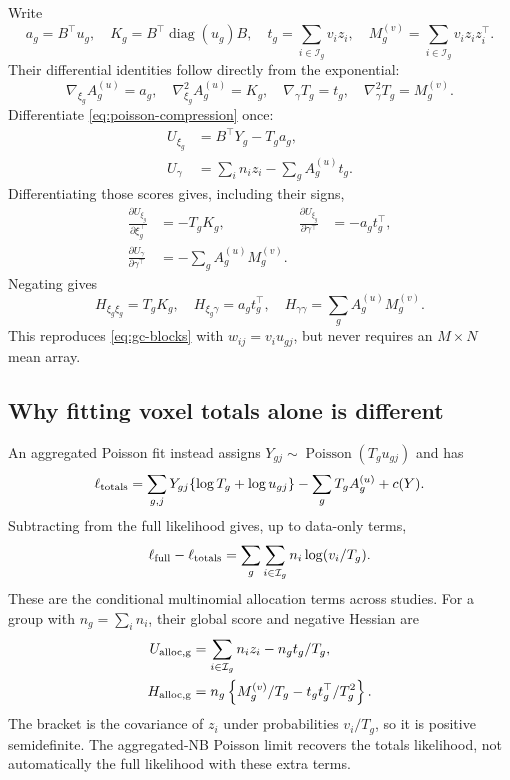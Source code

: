 \documentclass[11pt,a4paper]{article}
\newcommand{\diag}{\operatorname{diag}}
\numberwithin{equation}{section}
\begin{document}
Write
\[
 a_g=B^\top u_g,\quad
 K_g=B^\top\diag(u_g)B,\quad
 t_g=\sum_{i\in\mathcal I_g}v_i z_i,\quad
 M_g^{(v)}=\sum_{i\in\mathcal I_g}v_i z_i z_i^\top .
\]
Their differential identities follow directly from the exponential:
\[
 \nabla_{\xi_g}A_g^{(u)}=a_g,\quad
 \nabla_{\xi_g}^2 A_g^{(u)}=K_g,\quad
 \nabla_\gamma T_g=t_g,\quad
 \nabla_\gamma^2T_g=M_g^{(v)}.
\]
Differentiate \eqref{eq:poisson-compression} once:
\begin{align}
 U_{\xi_g}&=B^\top Y_g-T_g a_g,\\
 U_\gamma&=\sum_i n_i z_i-\sum_g A_g^{(u)}t_g.
\end{align}
Differentiating those scores gives, including their signs,
\begin{align}
 \frac{\partial U_{\xi_g}}{\partial\xi_g^\top}&=-T_gK_g,&
 \frac{\partial U_{\xi_g}}{\partial\gamma^\top}&=-a_gt_g^\top,\\
 \frac{\partial U_\gamma}{\partial\gamma^\top}
 &=-\sum_g A_g^{(u)}M_g^{(v)}.
\end{align}
Negating gives
\begin{equation}\label{eq:poisson-gc-final}
 H_{\xi_g\xi_g}=T_gK_g,\quad
 H_{\xi_g\gamma}=a_gt_g^\top,\quad
 H_{\gamma\gamma}=\sum_gA_g^{(u)}M_g^{(v)}.
\end{equation}
This reproduces \eqref{eq:gc-blocks} with $w_{ij}=v_i u_{gj}$,
but never requires an $M\times N$ mean array.

\subsection{Why fitting voxel totals alone is different}
An aggregated Poisson fit instead assigns
$Y_{gj}\sim\operatorname{Poisson}(T_gu_{gj})$ and has
\[
 \ell_{\rm totals}=\sum_{g,j}Y_{gj}
       \{\log T_g+\log u_{gj}\}-\sum_gT_gA_g^{(u)}+c(Y).
\]
Subtracting from the full likelihood gives, up to data-only terms,
\begin{equation}
 \ell_{\rm full}-\ell_{\rm totals}
 =\sum_g\sum_{i\in\mathcal I_g}n_i\log(v_i/T_g).
 \label{eq:allocation}
\end{equation}
These are the conditional multinomial allocation terms across studies.
For a group with $n_g=\sum_i n_i$, their global score and negative
Hessian are
\begin{align}
 U_{\rm alloc,g}
 &=\sum_{i\in\mathcal I_g}n_i z_i-n_g t_g/T_g,\\
 H_{\rm alloc,g}
 &=n_g\left\{M_g^{(v)}/T_g-t_gt_g^\top/T_g^2\right\}.
\end{align}
The bracket is the covariance of $z_i$ under probabilities $v_i/T_g$,
so it is positive semidefinite.
The aggregated-NB Poisson limit recovers the totals likelihood,
not automatically the full likelihood with these extra terms.
\end{document}
